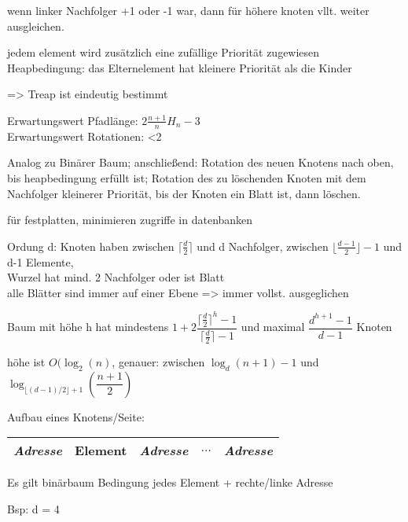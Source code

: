 wenn linker Nachfolger +1 oder -1 war, dann für höhere knoten vllt. weiter ausgleichen.





jedem element wird zusätzlich eine zufällige Priorität zugewiesen\\
Heapbedingung: das Elternelement hat kleinere Priorität als die Kinder

=> Treap ist eindeutig bestimmt

Erwartungswert Pfadlänge: $2\frac{n+1}{n}H_n-3$\\
Erwartungswert Rotationen: <2

Analog zu Binärer Baum; anschließend: Rotation des neuen Knotens nach oben, bis heapbedingung erfüllt ist;
Rotation des zu löschenden Knoten mit dem Nachfolger kleinerer Priorität, bis der Knoten ein Blatt ist, dann löschen.


\renewcommand{\min}{\lceil\frac{d}{2}\rceil}
\newcommand{\mincontent}{\lfloor\frac{d-1}{2}\rfloor}
für festplatten, minimieren zugriffe in datenbanken

Ordung d: Knoten haben zwischen $\min$ und d Nachfolger, zwischen $\mincontent -1$ und d-1 Elemente,\\
Wurzel hat mind. 2 Nachfolger oder ist Blatt \\
alle Blätter sind immer auf einer Ebene => immer vollst. ausgeglichen 

Baum mit höhe h hat mindestens $1+2\dfrac{\min^h - 1}{\min -1}$ und maximal $ \dfrac{d^{h+1}-1}{d-1}$ Knoten

höhe ist $O(\log_2(n)$, genauer: zwischen $\log_d(n+1)-1$ und $\log_{\lfloor(d-1)/2\rfloor+1}\left(\dfrac{n+1}{2}\right)$

Aufbau eines Knotens/Seite:
\begin{tabular}{|c|c|c|c|c|}
\hline
\textit{Adresse} & Element & \textit{Adresse} & $\dots$ & \textit{Adresse}\\
\hline
\end{tabular}

Es gilt binärbaum Bedingung jedes Element + rechte/linke Adresse

Bsp: d = 4


